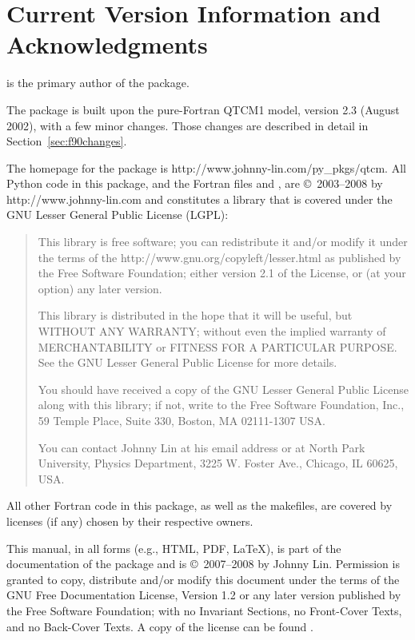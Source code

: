 \section{Current Version Information and Acknowledgments}  \label{sec:ver}


is the primary author of the package.

The  package is built upon the pure-Fortran QTCM1 model,
version 2.3 (August 2002), with a few minor changes.
Those changes are described in detail in
Section~\ref{sec:f90changes}.

The homepage for the  package is
%
	{http://www.johnny-lin.com/py_pkgs/qtcm}.
All Python code in this package, 
and the Fortran files  and ,
are \copyright\ 2003--2008 by 
%
		{http://www.johnny-lin.com} 
and constitutes a
library that is covered under the GNU Lesser General Public License
(LGPL):

\begin{quotation}
	This library is free software; you can redistribute it
	and/or modify it under the terms of the 
		{http://www.gnu.org/copyleft/lesser.html} 
	as published by
	the Free Software Foundation; either version 2.1 of the
	License, or (at your option) any later version.

	This library is distributed in the hope that it will be
	useful, but WITHOUT ANY WARRANTY; without even the implied
	warranty of MERCHANTABILITY or FITNESS FOR A PARTICULAR
	PURPOSE. See the GNU Lesser General Public License for more
	details.

	You should have received a copy of the GNU Lesser General
	Public License along with this library; if not, write to
	the Free Software Foundation, Inc., 59 Temple Place, Suite
	330, Boston, MA 02111-1307 USA.

	You can contact Johnny Lin at his email address 
	or at North Park University, Physics Department,
	3225 W. Foster Ave., Chicago, IL 60625, USA.  
\end{quotation}

All other Fortran code in this package, as well as the makefiles,
are covered by licenses (if any) chosen by their respective owners.

This manual, in all forms (e.g., HTML, PDF, \LaTeX),
is part of the documentation of the  package 
and is \copyright\ 2007--2008 by Johnny Lin.
Permission is granted to copy, distribute and/or modify 
this document under the terms of the 
GNU Free Documentation License, Version 1.2 
or any later version published by the Free Software Foundation; 
with no Invariant Sections, no Front-Cover Texts, 
and no Back-Cover Texts. 
A copy of the license can be found 
.

